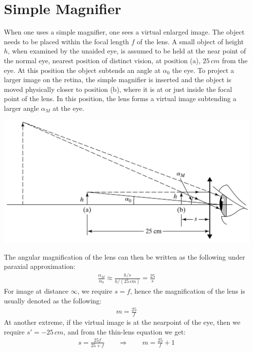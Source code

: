 \documentclass[11pt]{book}
\theoremstyle{break}
\theoremstyle{break}
\begin{document}
\newpage
\section[Simple Magnifier]{\color{red} Simple Magnifier\color{black}}
When one uses a simple magnifier, one sees a virtual enlarged image. The object needs to be placed within the focal length $f$ of the lens. A small object of height $h$, when examined by the unaided eye, is assumed to be held at the near point of the normal eye, nearest position of distinct vision, at position (a), $25\,cm$ from the eye. At this position the object subtends an angle at $\alpha_0$ the eye. To project a larger image on the retina, the simple magnifier is inserted and the object is moved physically closer to position (b), where it is at or just inside the focal point of the lens. In this position, the lens forms a virtual image subtending a larger angle $\alpha_M$ at the eye.

\begin{center}
\includegraphics[scale=0.35]{magnifier.png}
\end{center}

The angular magnification of the lens can then be written as the following under paraxial approximation:
\begin{align*}
\frac{\alpha_M}{\alpha_0} \approx \frac{h/s}{h/(25\, cm)} = \frac{25}{s} 
\end{align*}
For image at distance $\infty$, we require $s = f$, hence the magnification of the lens is usually denoted as the following:
\begin{align*}
m=\frac{25}{f}\tag{Image at $\infty$}
\end{align*}
At another extreme, if the virtual image is at the nearpoint of the eye, then we require $s' = -25\, cm$, and from the thin-lens equation we get:
\begin{align*}
s = \frac{25f}{25+f}\qquad\Rightarrow \qquad m = \frac{25}{f} + 1 \tag{Image at $25\, cm$}
\end{align*}
\end{document}
